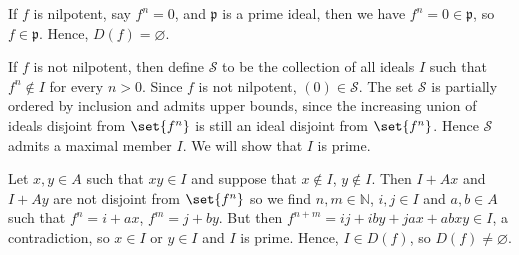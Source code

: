 If $f$ is nilpotent, say $f^n = 0$, and $\mathfrak{p}$ is a prime ideal, then we have
$f^n = 0 \in \mathfrak{p}$, so $f \in \mathfrak{p}$. Hence, $D(f) = \varnothing$.

If  $f$ is not nilpotent, then define $\mathcal{S}$ to be the collection of all
ideals $I$ such that $f^n\notin I$ for every $n > 0$. Since $f$ is not nilpotent,
$(0) \in \mathcal{S}$. The set $\mathcal{S}$ is partially ordered by inclusion
and admits upper bounds, since the increasing union of ideals disjoint from $\set{f^n}$ is
still an ideal disjoint from $\set{f^n}$. Hence $\mathcal{S}$ admits a maximal member
$I$. We will show that $I$ is prime.

Let $x, y \in A$ such that $xy \in I$ and suppose that $x\notin I$, $y\notin I$.
Then $I + Ax$ and $I + Ay$ are not disjoint from $\set{f^n}$ so we find
$n, m \in \mathbb{N}$, $i, j \in I$ and $a, b \in A$ such that
$f^n = i + ax$,  $f^m = j + by$. But then $f^{n+m} = ij + iby + jax + abxy \in I$,
a contradiction, so $x \in I$ or $y \in I$ and $I$ is prime. Hence, $I \in D(f)$,
so $D(f) \neq \varnothing$.
